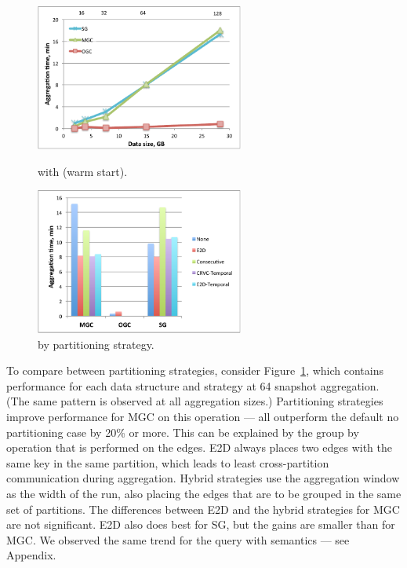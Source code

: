 \begin{figure}[t!]
\centering
\begin{minipage}{3in}
  \centering
  \includegraphics[width=2.7in]{figs/tgroupe_warm.pdf}
\vspace{-0.1in}
  \caption{ with  (warm start).}
  \label{fig:tgroupe}
\vspace{-0.1in}
\end{minipage}
\begin{minipage}{3in}
  \centering
  \includegraphics[width=2.7in]{figs/tgroupeparts.pdf}
\vspace{-0.1in}
  \caption{ by partitioning strategy.}
  \label{fig:tgroupeparts}
\vspace{-0.1in}
\end{minipage}
\end{figure}

To compare between partitioning strategies, consider
Figure~\ref{fig:tgroupeparts}, which contains performance for each
data structure and strategy at 64 snapshot aggregation.  (The same
pattern is observed at all aggregation sizes.)  Partitioning
strategies improve performance for MGC on this operation --- all
outperform the default no partitioning case by 20\% or more.  This can
be explained by the group by operation that is performed on the edges.
E2D always places two edges with the same key in the same partition,
which leads to least cross-partition communication during aggregation.
Hybrid strategies use the aggregation window as the width of the run,
also placing the edges that are to be grouped in the same set of
partitions.  The differences between E2D and the hybrid strategies for
MGC are not significant.  E2D also does best for SG, but the gains are
smaller than for MGC.  We observed the same trend for the
 query with  semantics --- see Appendix.


